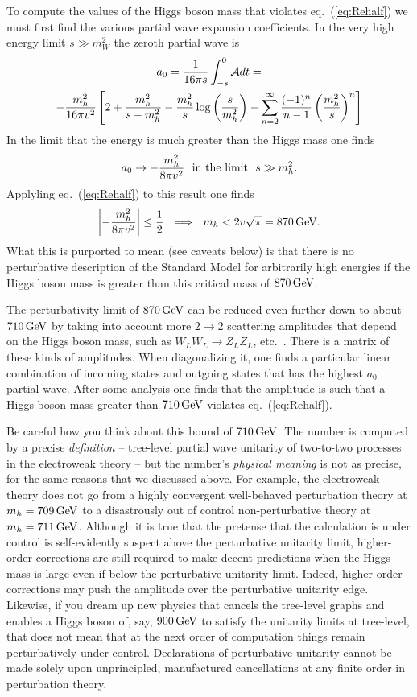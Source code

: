 \documentclass[12pt]{article}
\def\beq{\begin{eqnarray}}
\def\eeq{\end{eqnarray}}
\def\gev{\, {\rm GeV}}
\def\eq#1{eq.~(\ref{#1})}
\begin{document}
To compute the values of the Higgs boson mass that violates \eq{eq:Rehalf} we must first find the various partial wave expansion coefficients. In the very high energy limit $s\gg m_W^2$ the zeroth partial wave is
\begin{multline}
a_0=\frac{1}{16\pi s}\int_{-s}^0{\cal A}dt= \\ -\frac{m^2_h}{16\pi v^2}
\left[ 2+\frac{m^2_h}{s-m^2_h}-\frac{m^2_h}{s}\log\left( \frac{s}{m_h^2}\right)
-\sum_{n=2}^\infty \frac{(-1)^n}{n-1}\left(\frac{m_h^{2}}{s}\right)^n  \right]\nonumber
\end{multline}
In the  limit that the energy is much greater than the Higgs mass one finds
\beq
a_0\to -\frac{m^2_h}{8\pi v^2}~~{\rm in~the~limit}~~s\gg m_h^2.
\eeq
Applyling \eq{eq:Rehalf} to this result one finds
\beq
\left| -\frac{m^2_h}{8\pi  v^2}\right|\leq \frac{1}{2}~~\Longrightarrow~~
m_h<2v\sqrt{\pi}=870\gev.
\eeq
What this is purported to mean (see caveats below) is that there is no perturbative description of the Standard Model for arbitrarily high energies if the Higgs boson mass is greater than this critical mass of $870\gev$. 

The perturbativity limit of $870\gev$ can be reduced even further down to about $710\gev$ by taking into account more $2\to 2$ scattering amplitudes that depend on the Higgs boson mass, such as $W_LW_L\to Z_LZ_L$,  etc.~\cite{HHG,Djouadi:2005gi,Reina:2005ae}.  There is a matrix of these kinds of amplitudes.  When diagonalizing it, one finds a particular linear combination of incoming states and outgoing states that has the highest $a_0$ partial wave.  After some analysis one finds that the amplitude is such that a Higgs boson mass greater than $710\gev$ violates \eq{eq:Rehalf}.

Be careful how you think about this bound of $710\gev$. The number is computed by a precise {\it definition} -- tree-level partial wave unitarity of two-to-two processes in the electroweak theory -- but the number's {\it physical meaning} is not as precise, for the same reasons that we discussed above. For example, the electroweak theory does not go from a highly convergent well-behaved perturbation theory at $m_h=709\gev$ to a disastrously out of control non-perturbative theory at $m_h=711\gev$. Although it is true that the  pretense that the calculation is under control is self-evidently suspect above the perturbative unitarity limit,  higher-order corrections are still required to make decent  predictions when the Higgs mass is large even if below the perturbative unitarity limit.  Indeed, higher-order corrections may push the amplitude over the perturbative unitarity edge. Likewise, if you dream up new physics that cancels the tree-level graphs and enables a Higgs boson of, say, $900\gev$ to satisfy the unitarity limits at tree-level, that does not mean that at the next order of computation things remain perturbatively under control.  Declarations of perturbative unitarity cannot be made solely upon unprincipled, manufactured cancellations at any finite order in perturbation theory.
\end{document}
